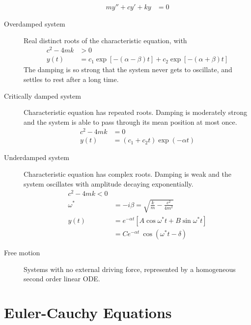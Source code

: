 \begin{description}
\begin{align}
            my'' + cy' + ky & = 0
        \end{align}
    \item[Overdamped system] Real distinct roots of the characteristic equation, with
        \begin{align}
            c^{2} - 4mk & > 0                                                             \\
            y(t)        & = c_{1}\exp[-(\alpha - \beta)t] + c_{2}\exp[-(\alpha + \beta)t]
        \end{align}
        The damping is so strong that the system never gets to oscillate, and settles to
        rest after a long time.
    \item[Critically damped system] Characteristic equation has repeated roots.
        Damping is moderately strong and the system is able to pass through its mean
        position at most once.
        \begin{align}
            c^{2} - 4mk & = 0                                \\
            y(t)        & = (c_{1}  + c_{2}t)\exp(-\alpha t)
        \end{align}
    \item[Underdamped system] Characteristic equation has complex roots. Damping is weak and
        the system oscillates with amplitude decaying exponentially.
        \begin{align}
            c^{2} - 4mk < 0                                                       \\
            \omega^{*} & = -i\beta = \sqrt{\frac{k}{m} - \frac{c^{2}}{4m^{2}}}    \\
            y(t)       & = e^{-\alpha t}[A \cos \omega^{*}t + B \sin \omega^{*}t] \\
                       & =Ce^{-\alpha t}\ \cos(\omega^{*}t - \delta)
        \end{align}
    \item[Free motion] Systems with no external driving force, represented by a
        homogeneous second order linear ODE.
\end{description}

\section{Euler-Cauchy Equations}

